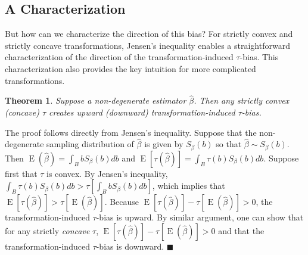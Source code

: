 \documentclass[12pt]{article}
\newtheorem{theorem}{Theorem}
\newenvironment{proof}[1][Proof]{\begin{trivlist}
\item[\hskip \labelsep {\bfseries #1}]}{\end{trivlist}}
\DeclareMathOperator*{\E}{\text{E}}
\begin{document}
\subsection*{A Characterization}

But how can we characterize the direction of this bias? 
For strictly convex and strictly concave transformations, Jensen's inequality enables a straightforward characterization of the direction of the transformation-induced $\tau$-bias. 
This characterization also provides the key intuition for more complicated transformations.
\begin{theorem}\label{thm:direction}
Suppose a non-degenerate estimator $\hat{\beta}$. Then any strictly convex (concave) $\tau$ creates upward (downward) transformation-induced $\tau$-bias.
\end{theorem} 
\begin{proof}
The proof follows directly from Jensen's inequality. 
Suppose that the non-degenerate sampling distribution of $\hat{\beta}$ is given by $S_\beta(b)$ so that $\hat{\beta} \sim S_\beta(b)$. 
Then $\E(\hat{\beta}) = \int_{B}bS_\beta(b)db$ and $\E[\tau(\hat{\beta})]  = \int_{B}\tau(b)S_\beta(b)db$. 
Suppose first that $\tau$ is convex. 
By Jensen's inequality, $\int_{B}\tau(b)S_\beta(b)db > \tau \left[ \int_{B}bS_\beta(b)db \right]$, which implies that $\E[\tau(\hat{\beta})] > \tau[\E(\hat{\beta})]$. 
Because $\E[\tau(\hat{\beta})] - \tau[\E(\hat{\beta})] > 0$, the transformation-induced $\tau$-bias is upward. 
By similar argument, one can show that for any strictly \textit{concave} $\tau$, $\E[\tau(\hat{\beta})] - \tau[\E(\hat{\beta})] > 0$ and that the transformation-induced $\tau$-bias is downward. $\blacksquare$
\end{proof}
\end{document}
